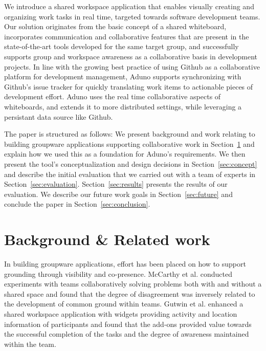 \documentclass[conference]{IEEEtran}
\begin{document}
We introduce a shared workspace application that enables visually creating and organizing work tasks in real time, targeted towards software development teams. Our solution originates from the basic concept of a shared whiteboard, incorporates communication and collaborative features that are present in the state-of-the-art tools developed for the same target group, and successfully supports group and workspace awareness as a collaborative basis in development projects. In line with the growing best practice of using Github as a collaborative platform for development management, Aduno supports synchronizing with Github's issue tracker for quickly translating work items to actionable pieces of development effort.  Aduno uses the real time collaborative aspects of whiteboards, and extends it to more distributed settings, while leveraging a persistant data source like Github.

The paper is structured as follows: We present background and work relating to building groupware applications supporting collaborative work in Section~\ref{sec:background} and explain how we used this as a foundation for Aduno's requirements. We then present the tool's conceptualization and design decisions in Section~\ref{sec:concept} and describe the initial evaluation that we carried out with a team of experts in Section~\ref{sec:evaluation}. Section~\ref{sec:results} presents the results of our evaluation. We describe our future work goals in Section~\ref{sec:future} and conclude the paper in Section~\ref{sec:conclusion}.


\section{Background \& Related work}
\label{sec:background}

In building groupware applications, effort has been placed on how to support grounding through visibility and co-presence. McCarthy et al. \cite{MCMM91} conducted experiments with teams collaboratively solving problems both with and without a shared space and found that the degree of disagreement was inversely related to the development of common ground within teams. Gutwin et al. \cite{GRG96} enhanced a shared workspace application with widgets providing activity and location information of participants and found that the add-ons provided value towards the successful completion of the tasks and the degree of awareness maintained within the team.
\end{document}
